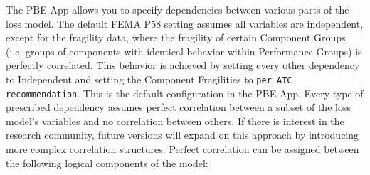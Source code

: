 The PBE App allows you to specify dependencies between various parts of the loss model. The default FEMA P58 setting assumes all variables are independent, except for the fragility data, where the fragility of certain Component Groups (i.e. groups of components with identical behavior within Performance Groups) is perfectly correlated. This behavior is achieved by setting every other dependency to Independent and setting the Component Fragilities to \texttt{per ATC recommendation}. This is the default configuration in the PBE App.
Every type of prescribed dependency assumes perfect correlation between a subset of the loss model’s variables and no correlation between others. If there is interest in the research community, future versions will expand on this approach by introducing more complex correlation structures.
Perfect correlation can be assigned between the following logical components of the model:

